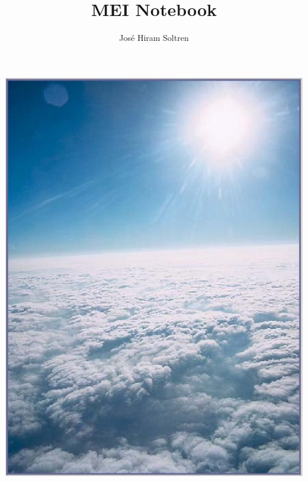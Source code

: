 \documentclass[11pt,twoside,letterpaper,onecolumn]{book}
\author{Jos\'e Hiram Soltren}
\title{MEI Notebook}
\begin{document}


\begin{titlepage} %

\begin{center}
\includegraphics[width=1.0\linewidth]{blue-sky}
\end{center}


\end{titlepage}
\end{document}
